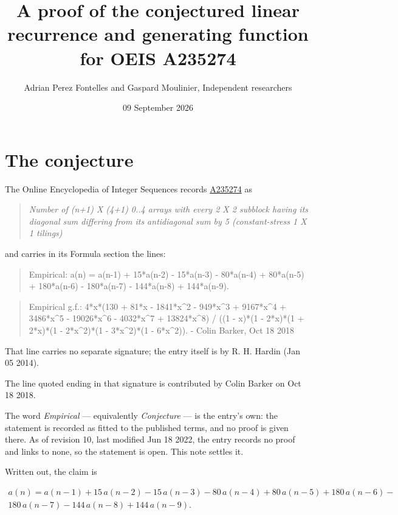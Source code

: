 \documentclass[11pt]{article}
\title{A proof of the conjectured linear recurrence and generating function for OEIS A235274}
\author{Adrian Perez Fontelles and Gaspard Moulinier, Independent researchers}
\date{09 September 2026}
\theoremstyle{definition}
\begin{document}
\maketitle
\section{The conjecture}

The Online Encyclopedia of Integer Sequences records \href{https://oeis.org/A235274}{A235274} as

\begin{quote}\itshape Number of (n+1) X (4+1) 0..4 arrays with every 2 X 2 subblock having its diagonal sum differing from its antidiagonal sum by 5 (constant-stress 1 X 1 tilings)\end{quote}

and carries in its Formula section the lines:

\begin{quote}\ttfamily Empirical: a(n) = a(n-1) + 15*a(n-2) - 15*a(n-3) - 80*a(n-4) + 80*a(n-5) + 180*a(n-6) - 180*a(n-7) - 144*a(n-8) + 144*a(n-9).\end{quote}

\begin{quote}\ttfamily Empirical g.f.: 4*x*(130 + 81*x - 1841*x\textasciicircum{}2 - 949*x\textasciicircum{}3 + 9167*x\textasciicircum{}4 + 3486*x\textasciicircum{}5 - 19026*x\textasciicircum{}6 - 4032*x\textasciicircum{}7 + 13824*x\textasciicircum{}8) / ((1 - x)*(1 - 2*x)*(1 + 2*x)*(1 - 2*x\textasciicircum{}2)*(1 - 3*x\textasciicircum{}2)*(1 - 6*x\textasciicircum{}2)). - Colin Barker, Oct 18 2018\end{quote}

That line carries no separate signature; the entry itself is by R. H. Hardin (Jan 05 2014).

The line quoted ending in that signature is contributed by Colin Barker on Oct 18 2018.

The word {\itshape Empirical} --- equivalently {\itshape Conjecture} --- is the entry's own: the statement is recorded as fitted to the published terms, and no proof is given there. As of revision 10, last modified Jun 18 2022, the entry records no proof and links to none, so the statement is open. This note settles it.

Written out, the claim is

\begin{multline*} a(n) = a(n-1) + 15\,a(n-2) - 15\,a(n-3) - 80\,a(n-4) + 80\,a(n-5) + 180\,a(n-6) - \\ 180\,a(n-7) - 144\,a(n-8) + 144\,a(n-9). \end{multline*}
\end{document}

